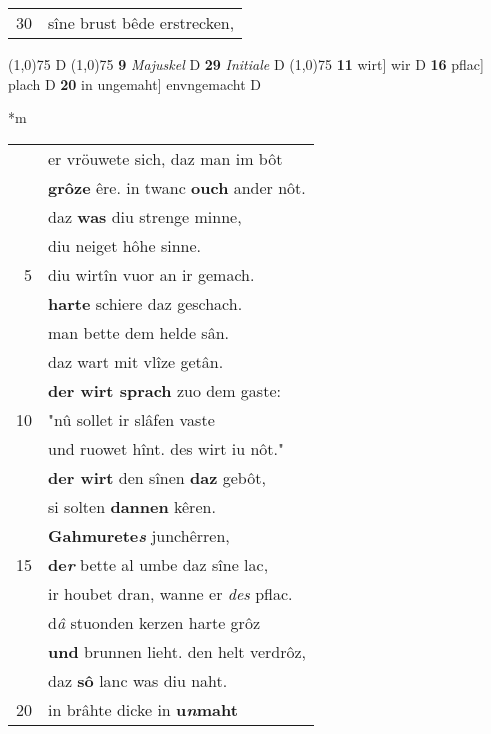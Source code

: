 \documentclass[8pt,a4paper,notitlepage]{article}
\begin{document}
\begin{table}[ht]
\begin{minipage}[t]{0.5\linewidth}
\begin{tabular}{rl}
30 & sîne brust bêde erstrecken,\\ 
\end{tabular}
\scriptsize
\line(1,0){75} \newline
D \newline
\line(1,0){75} \newline
\textbf{9} \textit{Majuskel} D  \textbf{29} \textit{Initiale} D  \newline
\line(1,0){75} \newline
\textbf{11} wirt] wir D \textbf{16} pflac] plach D \textbf{20} in ungemaht] envngemacht D \newline
\end{minipage}
\hspace{0.5cm}
\begin{minipage}[t]{0.5\linewidth}
\small
\begin{center}*m
\end{center}
\begin{tabular}{rl}
 & er vröuwete sich, daz man im bôt\\ 
 & \textbf{grôze} êre. in twanc \textbf{ouch} ander nôt.\\ 
 & daz \textbf{was} diu strenge minne,\\ 
 & diu neiget hôhe sinne.\\ 
5 & diu wirtîn vuor an ir gemach.\\ 
 & \textbf{harte} schiere daz geschach.\\ 
 & man bette dem helde sân.\\ 
 & daz wart mit vlîze getân.\\ 
 & \textbf{der wirt sprach} zuo dem gaste:\\ 
10 & "nû sollet ir slâfen vaste\\ 
 & und ruowet hînt. des wirt iu nôt."\\ 
 & \textbf{der wirt} den sînen \textbf{daz} gebôt,\\ 
 & si solten \textbf{dannen} kêren.\\ 
 & \textbf{Gahmurete\textit{s}} junchêrren,\\ 
15 & \textbf{de\textit{r}} bette al umbe daz sîne lac,\\ 
 & ir houbet dran, wanne er \textit{des} pflac.\\ 
 & d\textit{â} stuonden kerzen harte grôz\\ 
 & \textbf{und} brunnen lieht. den helt verdrôz,\\ 
 & daz \textbf{sô} lanc was diu naht.\\ 
20 & in brâhte dicke in \textbf{u\textit{n}maht}\\ 

\end{tabular}
\end{minipage}
\end{table}
\end{document}
